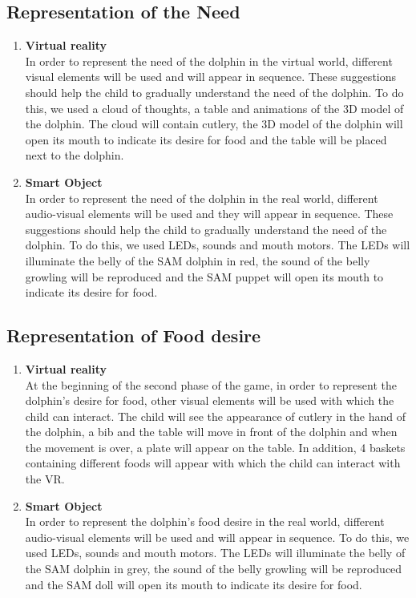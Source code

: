 \documentclass [12pt]{article}
\begin{document}
\subsection{Representation of the Need}
\begin{enumerate}
\item \textbf{Virtual reality}\\
In order to represent the need of the dolphin in the virtual world, different visual elements will be used and will appear in sequence. These suggestions should help the child to gradually understand the need of the dolphin. To do this, we used a cloud of thoughts, a table and animations of the 3D model of the dolphin. The cloud will contain cutlery, the 3D model of the dolphin will open its mouth to indicate its desire for food and the table will be placed next to the dolphin. 
\item \textbf{Smart Object}\\
In order to represent the need of the dolphin in the real world, different audio-visual elements will be used and they will appear in sequence. These suggestions should help the child to gradually understand the need of the dolphin. To do this, we used LEDs, sounds and mouth motors. The LEDs will illuminate the belly of the SAM dolphin in red, the sound of the belly growling will be reproduced and the SAM puppet will open its mouth to indicate its desire for food. 
\end{enumerate}
\subsection{Representation of Food desire}
\begin{enumerate}
\item \textbf{Virtual reality}\\
At the beginning of the second phase of the game, in order to represent the dolphin's desire for food, other visual elements will be used with which the child can interact. The child will see the appearance of cutlery in the hand of the dolphin, a bib and the table will move in front of the dolphin and when the movement is over, a plate will appear on the table. In addition, 4 baskets containing different foods will appear with which the child can interact with the VR. 
\item \textbf{Smart Object}\\
In order to represent the dolphin's food desire in the real world, different audio-visual elements will be used and will appear in sequence. To do this, we used LEDs, sounds and mouth motors. The LEDs will illuminate the belly of the SAM dolphin in grey, the sound of the belly growling will be reproduced and the SAM doll will open its mouth to indicate its desire for food. 
\end{enumerate}
\end{document}
